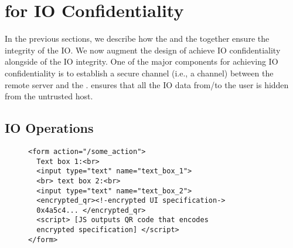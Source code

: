 \iffalse
\begin{figure}[h]
\centering
\texttt{[image: inputPrivacy.pdf]}
\caption{Input Confidentiality}
\label{fig:inputPrivacy}
\centering
\end{figure}
\fi



\section{\name for IO Confidentiality}
\label{sec:confidentiality}


In the previous sections, we describe how the \name \js and the \device together ensure the integrity of the IO. We now augment the design of \name achieve IO confidentiality alongside of the IO integrity. One of the major components for achieving IO confidentiality is to establish a secure channel (i.e., a \tls channel) between the remote server and the \device. \tls ensures that all the IO data from/to the user is hidden from the untrusted host.  


\subsection{IO Operations}
\label{sec:confidentiality:io}

\begin{figure}[t]
\small
\begin{lstlisting}[mathescape=true]
<form action="/some_action">
  Text box 1:<br>
  <input type="text" name="text_box_1">
  <br> text box 2:<br>
  <input type="text" name="text_box_2">
  <encrypted_qr><!-encrypted UI specification->
  0x4a5c4... </encrypted_qr>
  <script> [JS outputs QR code that encodes 
  encrypted specification] </script>
</form> 
\end{lstlisting} 
\end{figure}



